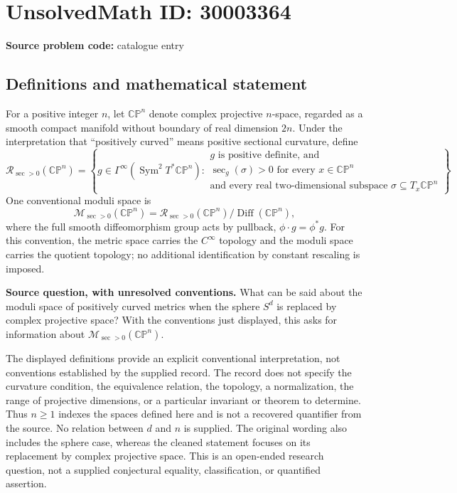 \documentclass[11pt]{article}
\begin{document}
\section*{UnsolvedMath ID: 30003364}
\textbf{Source problem code:} catalogue entry
\subsection{Definitions and mathematical statement}
For a positive integer \(n\), let \(\mathbb{CP}^{n}\) denote complex projective \(n\)-space, regarded as a smooth compact manifold without boundary of real dimension \(2n\). Under the interpretation that ``positively curved'' means positive sectional curvature, define
\[
\mathcal R_{\sec>0}(\mathbb{CP}^{n})
=\left\{g\in\Gamma^{\infty}(\operatorname{Sym}^{2}T^{*}\mathbb{CP}^{n}):\begin{array}{l}g\text{ is positive definite, and}\\ \sec_g(\sigma)>0\text{ for every }x\in\mathbb{CP}^{n}\\ \text{and every real two-dimensional subspace }\sigma\subseteq T_x\mathbb{CP}^{n}\end{array}\right\}.
\]
One conventional moduli space is
\[
\mathcal M_{\sec>0}(\mathbb{CP}^{n})
=\mathcal R_{\sec>0}(\mathbb{CP}^{n})/\operatorname{Diff}(\mathbb{CP}^{n}),
\]
where the full smooth diffeomorphism group acts by pullback, \(\phi\cdot g=\phi^{*}g\). For this convention, the metric space carries the \(C^{\infty}\) topology and the moduli space carries the quotient topology; no additional identification by constant rescaling is imposed.

\textbf{Source question, with unresolved conventions.} What can be said about the moduli space of positively curved metrics when the sphere \(S^{d}\) is replaced by complex projective space? With the conventions just displayed, this asks for information about \(\mathcal M_{\sec>0}(\mathbb{CP}^{n})\).

The displayed definitions provide an explicit conventional interpretation, not conventions established by the supplied record. The record does not specify the curvature condition, the equivalence relation, the topology, a normalization, the range of projective dimensions, or a particular invariant or theorem to determine. Thus \(n\geq1\) indexes the spaces defined here and is not a recovered quantifier from the source. No relation between \(d\) and \(n\) is supplied. The original wording also includes the sphere case, whereas the cleaned statement focuses on its replacement by complex projective space. This is an open-ended research question, not a supplied conjectural equality, classification, or quantified assertion.
\end{document}

